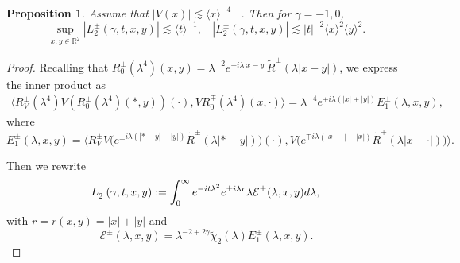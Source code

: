\documentclass[reqno]{amsart}
\newtheorem{proposition}[theorem]{Proposition}
\numberwithin{equation}{section}
\begin{document}
\begin{proposition}\label{high_2}
Assume that $|V(x)| \lesssim \langle x \rangle^{-4-}$. Then for $\gamma=-1,0$,
$$
 \sup _{x, y \in \mathbb{R}^2}\left|L_{2}^{\pm}(\gamma,t,x,y)\right| \lesssim \langle t\rangle^{-1}, \ \ \ \
\left|L_{2}^{\pm}(\gamma,t,x,y)\right| \lesssim |t|^{-2} \langle x \rangle^2 \langle y \rangle^2.
$$
\end{proposition}
\begin{proof}
Recalling that $R^\pm_0(\lambda^4)(x,y) = \lambda^{-2}e^{\pm i\lambda|x-y|}\widetilde{R}^\pm(\lambda|x-y|)$, we express the inner product as
\begin{align*}
\big\langle R_V^{\pm}(\lambda^4) V(R_0^{\pm}(\lambda^4)(*, y))(\cdot), VR_0^{\mp}(\lambda^4)(x, \cdot)\big\rangle
= \lambda^{-4} e^{\pm i \lambda(|x|+|y|)} E_{1}^{\pm}(\lambda,x,y),
\end{align*}
where
\[
E_{1}^{\pm}(\lambda,x,y) = \big\langle  R_V^{\pm} V\big(e^{\pm i \lambda(|*-y|-|y|)} \widetilde{R}^{\pm}(\lambda|*-y|)\big)(\cdot), V\big(e^{\mp i \lambda(|x-\cdot|-|x|)} \widetilde{R}^{\mp}(\lambda|x-\cdot|)\big)\big\rangle.
\]

Then we rewrite
\begin{equation}\label{eq:high_2}
  L_{2}^{\pm}(\gamma,t,x,y):=\int_0^{\infty} e^{-it \lambda^2}  e^{\pm i\lambda r} \lambda\mathcal{E}^\pm(\lambda,x,y)  d \lambda, \\
\end{equation}
with $r=r(x,y)=|x|+|y|$ and
$$
\mathcal{E}^{\pm}(\lambda,x,y)=\lambda^{-2+2\gamma}\widetilde{\chi}_2(\lambda) E_{1}^{\pm}(\lambda,x,y).
$$


\end{proof}
\end{document}
